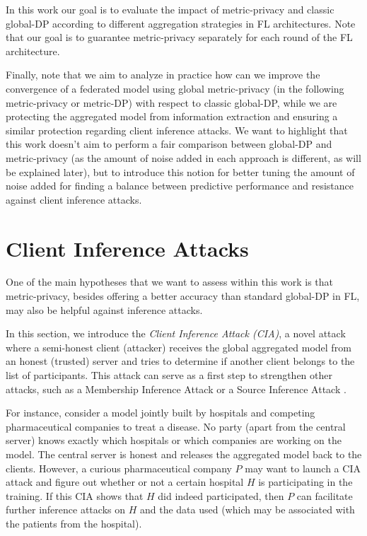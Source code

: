 \documentclass[5p,times]{elsarticle}
\begin{document}
In this work our goal is to evaluate the impact of metric-privacy and classic global-DP according to different aggregation strategies in FL architectures. Note that our goal is to guarantee metric-privacy separately for each round of the FL architecture. 

Finally, note that we aim to analyze in practice how can we improve the convergence of a federated model using global metric-privacy (in the following metric-privacy or metric-DP) with respect to classic global-DP, while we are protecting the aggregated model from information extraction and ensuring a similar protection regarding client inference attacks. We want to highlight that this work doesn't aim to perform a fair comparison between global-DP and metric-privacy (as the amount of noise added in each approach is different, as will be explained later), but to introduce this notion for better tuning the amount of noise added for finding a balance between predictive performance and resistance against client inference attacks.

\section{Client Inference Attacks}\label{sec:ciattacks}

One of the main hypotheses that we want to assess within this work is that metric-privacy, besides offering a better accuracy than standard global-DP in FL, may also be helpful against inference attacks.


In this section, we introduce the
\emph{Client Inference Attack (CIA)}, a novel attack where a semi-honest client (attacker) receives the global aggregated model from an honest (trusted) server and tries to determine if another client belongs to the list of participants. This attack can serve as a first step to strengthen other attacks, such as a Membership Inference Attack \cite{mia_attack} or a Source Inference Attack \cite{sia_paper}. 


For instance, consider a model jointly built by hospitals and competing pharmaceutical companies to treat a disease. No party (apart from the central server) knows exactly which hospitals or which companies are working on the model. The central server is honest and releases the aggregated model back to the clients. However, a curious  pharmaceutical company $P$ may want to launch a CIA attack and figure out whether or not a certain hospital $H$ is participating in the training. If this CIA shows that $H$ did indeed participated, then $P$ can facilitate further inference attacks on $H$ and the data used (which may be associated with the patients from the hospital). 
\end{document}
